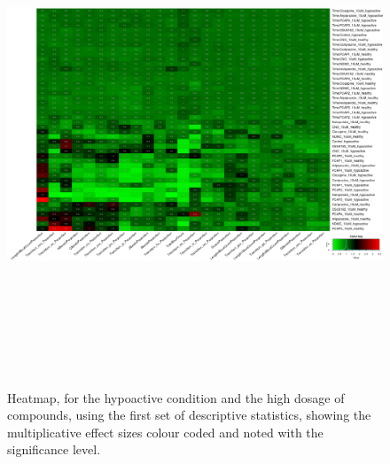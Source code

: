 \documentclass[a4paper,12pt]{article}
\begin{document}
\begin{figure}[h!]
\begin{center}
\includegraphics[width=16cm,height=15cm]{DarkApoLow_heatmap_10_microM_DarkApoLow_B2MAP.png}
\caption{Heatmap, for the hypoactive condition and the high dosage of compounds, using the first set of descriptive statistics, showing the multiplicative effect sizes colour coded and noted with the significance level.}
\end{center}
\end{figure}
\newpage
\end{document}
